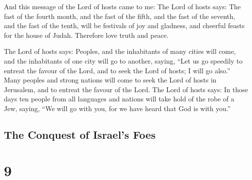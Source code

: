  And this message of the Lord of hosts came to me:
 The Lord of hosts says: The fast of the fourth month, and
the fast of the fifth, and the fast of the seventh, and the fast of the
tenth, will be festivals of joy and gladness, and cheerful feasts for
the house of Judah. Therefore love truth and peace.

 The Lord of hosts says: Peoples, and the inhabitants of
many cities will come,  and the inhabitants of one city
will go to another, saying, ``Let us go speedily to entreat the favour
of the Lord, and to seek the Lord of hosts; I will go also.''
 Many peoples and strong nations will come to seek the Lord
of hosts in Jerusalem, and to entreat the favour of the Lord.
 The Lord of hosts says: In those days ten people from all
languages and nations will take hold of the robe of a Jew, saying, ``We
will go with you, for we have heard that God is with you.''

\hypertarget{the-conquest-of-israels-foes}{%
\subsection{The Conquest of Israel's
Foes}\label{the-conquest-of-israels-foes}}

\hypertarget{section-8}{%
\section{9}\label{section-8}}

